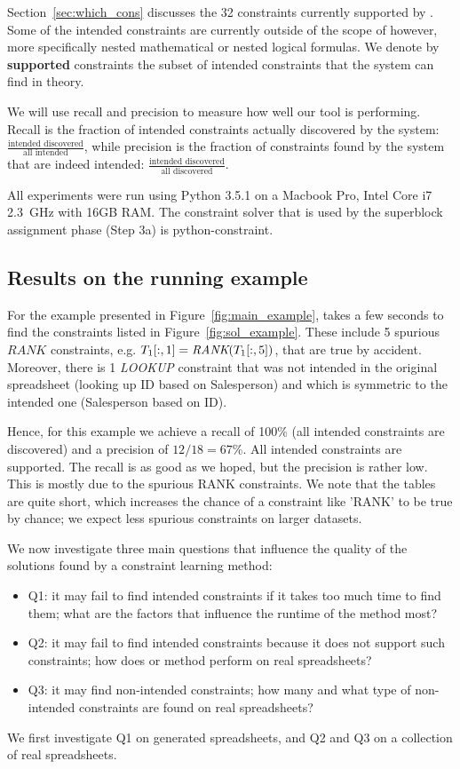 Section~\ref{sec:which_cons} discusses the 32 constraints currently supported by \sname {}. Some of the intended constraints are currently outside of the scope of \sname however, more specifically nested mathematical or nested logical formulas. We denote by \textbf{supported} constraints the subset of intended constraints that the system can find in theory.

We will use recall and precision to measure how well our tool is performing. Recall is the fraction of intended constraints actually discovered by the system: $\frac{\text{intended discovered}}{\text{all intended}}$, while precision is the fraction of constraints found by the system that are indeed intended: $\frac{\text{intended discovered}}{\text{all discovered}}$.

All experiments were run using Python 3.5.1 on a Macbook Pro, Intel Core i7 2.3~GHz with 16GB RAM.
The constraint solver that is used by the superblock assignment phase (Step 3a) is python-constraint\cite{python_constraint}.



\subsection{Results on the running example}
For the example presented in Figure~\ref{fig:main_example},
\sname takes a few seconds to find the constraints listed in Figure~\ref{fig:sol_example}.
These include 5 spurious $\textit{RANK}$ constraints, e.g. $T_1[:,1] = \textit{RANK}(T_1[:,5])$, that are true by accident.
Moreover, there is 1 \textit{LOOKUP} constraint that was not intended in the original spreadsheet (looking up ID based on Salesperson) and which is symmetric to the intended one (Salesperson based on ID).

Hence, for this example we achieve a recall of 100\% (all intended constraints are discovered) and a precision of $12/18 = 67\%$. All intended constraints are supported. The recall is as good as we hoped, but the precision is rather low. This is mostly due to the spurious RANK constraints. We note that the tables are quite short, which increases the chance of a constraint like 'RANK' to be true by chance; we expect less spurious constraints on larger datasets.

We now investigate three main questions that influence the quality of the solutions found by a constraint learning method:
\begin{itemize}
\item Q1: it may fail to find intended constraints if it takes too much time to find them; what are the factors that influence the runtime of the method most?
\item Q2: it may fail to find intended constraints because it does not support such constraints; how does or method perform on real spreadsheets?
\item Q3: it may find non-intended constraints; how many and what type of non-intended constraints are found on real spreadsheets?
\end{itemize}
We first investigate Q1 on generated spreadsheets, and Q2 and Q3 on a collection of real spreadsheets.


